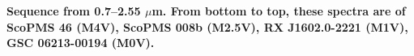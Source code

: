 {\bf Sequence from 0.7–2.55 $\mu$m. From bottom to top, these spectra are of ScoPMS 46 (M4V), ScoPMS 008b (M2.5V), RX J1602.0-2221 (M1V), GSC 06213-00194 (M0V).\label{fig:stack-plot-m}}
